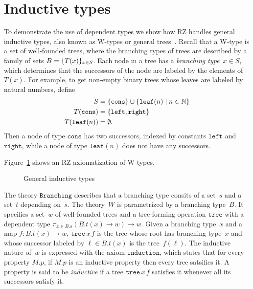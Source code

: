 \section{Inductive types}
\label{sec:outp-induct-types}

\label{sec:inductive-types}

To demonstrate the use of dependent types we show how RZ handles
general inductive types, also known as W-types or general
trees~\cite{nordstroem90:_progr_martin_type_theor}. Recall that a
W-type is a set of well-founded trees, where the branching types of
trees are described by a family of sets $B = \{T(x)\}_{x \in S}$.
Each node in a tree has a \emph{branching type}~$x \in S$, which
determines that the successors of the node are labeled by the elements
of~$T(x)$. For example, to get non-empty binary trees whose leaves are
labeled by natural numbers, define
%
\begin{align*}
  S &= \{\mathtt{cons}\} \cup \{\mathtt{leaf}(n) \mid n \in \mathbb{N}\}
  \\
  T(\mathtt{cons}) &= \{\mathtt{left}, \mathtt{right}\}
  \\
  T(\mathtt{leaf}(n)) &= \emptyset.
\end{align*}
%
Then a node of type $\mathtt{cons}$ has two successors, indexed by
constants $\mathtt{left}$ and $\mathtt{right}$, while a node of type
$\mathtt{leaf}(n)$ does not have any successors.

Figure~\ref{fig:wtype} shows an RZ axiomatization of W-types.
%
\begin{figure}
  \centering
  \caption{General inductive types}
  \label{fig:wtype}
\end{figure}
%
The theory $\mathtt{Branching}$ describes that a branching type
consits of a set~$s$ and a set~$t$ depending on~$s$. The theory~$W$ is
parametrized by a branching type~$B$. It specifies a set~$w$ of
well-founded trees and a tree-forming operation $\mathtt{tree}$ with a
dependent type $\pi_{x \in B.s} (B.t(x) \to w) \to w$. Given a
branching type~$x$ and a map $f : B.t(x) \to w$, $\mathtt{tree}\,x\,f$
is the tree whose root has branching type~$x$ and whose successor
labeled by $\ell \in B.t(x)$ is the tree~$f(\ell)$. The inductive
nature of~$w$ is expressed with the axiom $\mathtt{induction}$, which
states that for every property $M.p$, if $M.p$ is an inductive
property then every tree satsifies it. A property is said to be
\emph{inductive} if a tree $\mathtt{tree}\,x\,f$ satisfies it whenever
all its successors satisfy it.

